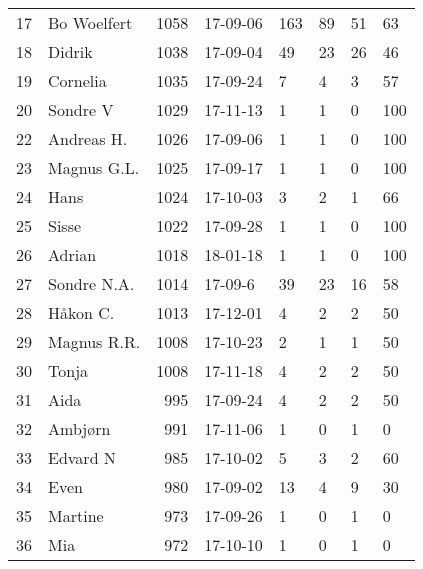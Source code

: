 \begin{longtable}{|r|l|r|l|l|l|l|l|}
17 &          Bo Woelfert &  1058 &    17-09-06 &             163 &    89 &      51 &        63 \\
18 &               Didrik &  1038 &    17-09-04 &              49 &    23 &      26 &        46 \\
19 &             Cornelia &  1035 &    17-09-24 &               7 &     4 &       3 &        57 \\
20 &             Sondre V &  1029 &    17-11-13 &               1 &     1 &       0 &       100 \\
22 &           Andreas H. &  1026 &    17-09-06 &               1 &     1 &       0 &       100 \\
23 &          Magnus G.L. &  1025 &    17-09-17 &               1 &     1 &       0 &       100 \\
24 &                 Hans &  1024 &    17-10-03 &               3 &     2 &       1 &        66 \\
25 &                Sisse &  1022 &    17-09-28 &               1 &     1 &       0 &       100 \\
26 &               Adrian &  1018 &    18-01-18 &               1 &     1 &       0 &       100 \\
27 &          Sondre N.A. &  1014 &     17-09-6 &              39 &    23 &      16 &        58 \\
28 &             Håkon C. &  1013 &    17-12-01 &               4 &     2 &       2 &        50 \\
29 &          Magnus R.R. &  1008 &    17-10-23 &               2 &     1 &       1 &        50 \\
30 &                Tonja &  1008 &    17-11-18 &               4 &     2 &       2 &        50 \\
31 &                 Aida &   995 &    17-09-24 &               4 &     2 &       2 &        50 \\
32 &              Ambjørn &   991 &    17-11-06 &               1 &     0 &       1 &         0 \\
33 &             Edvard N &   985 &    17-10-02 &               5 &     3 &       2 &        60 \\
34 &                 Even &   980 &    17-09-02 &              13 &     4 &       9 &        30 \\
35 &              Martine &   973 &    17-09-26 &               1 &     0 &       1 &         0 \\
36 &                  Mia &   972 &    17-10-10 &               1 &     0 &       1 &         0 \\

\end{longtable}
